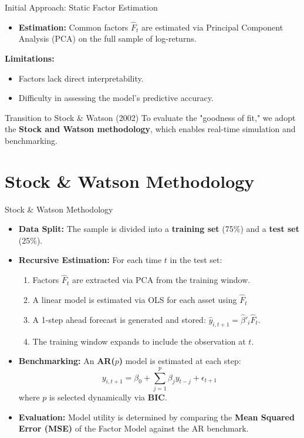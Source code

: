 \documentclass{beamer}
\begin{document}
\begin{frame}{Initial Approach: Static Factor Estimation}
    \begin{itemize}
        \item \textbf{Estimation:} Common factors $\hat{F}_t$ are estimated via Principal Component Analysis (PCA) on the full sample of log-returns.
    \end{itemize}
    \textbf{Limitations:}
    \begin{itemize}
        \item Factors lack direct interpretability.
        \item Difficulty in assessing the model's predictive accuracy.
    \end{itemize}
    \begin{block}{Transition to Stock \& Watson (2002)}
        To evaluate the "goodness of fit," we adopt the \textbf{Stock and Watson methodology}, which enables real-time simulation and benchmarking.
    \end{block}
\end{frame}

\section{Stock \& Watson Methodology}

\begin{frame}{Stock \& Watson Methodology}
    \begin{itemize}
        \item \textbf{Data Split:} The sample is divided into a \textbf{training set} (75\%) and a \textbf{test set} (25\%).
        \item \textbf{Recursive Estimation:} For each time $t$ in the test set:
        \begin{enumerate}
            \item Factors $\hat{F}_t$ are extracted via PCA from the training window.
            \item A linear model is estimated via OLS for each asset using $\hat{F}_t$
            \item A 1-step ahead forecast is generated and stored: $\hat{y}_{i,t+1} = \hat{\beta}'_i \hat{F}_t$.
            \item The training window expands to include the observation at $t$.
        \end{enumerate}
        \item \textbf{Benchmarking:} An \textbf{AR($p$)} model is estimated at each step:
        \begin{equation*}
            y_{i, t+1} = \beta_0 + \sum_{j=1}^{p} \beta_j y_{t-j} + \epsilon_{t+1}
        \end{equation*}
        where $p$ is selected dynamically via \textbf{BIC}.
        \item \textbf{Evaluation:} Model utility is determined by comparing the \textbf{Mean Squared Error (MSE)} of the Factor Model against the AR benchmark.
    \end{itemize}
\end{frame}
\end{document}
